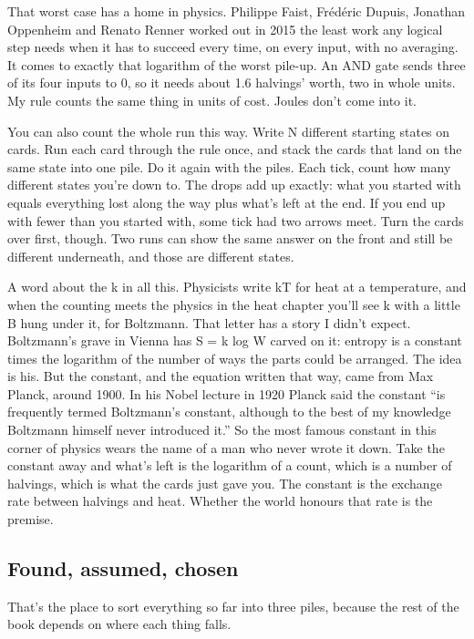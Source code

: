 \documentclass[11pt,twoside]{article}
\theoremstyle{thielethm}
\theoremstyle{thieledef}
\theoremstyle{thieledef}
\theoremstyle{thieledef}
\theoremstyle{thielethm}
\theoremstyle{thieleobs}
\theoremstyle{thielethm}
\begin{document}
That worst case has a home in physics. Philippe Faist, Frédéric Dupuis, Jonathan Oppenheim and Renato Renner worked out in 2015 the least work any logical step needs when it has to succeed every time, on every input, with no averaging. It comes to exactly that logarithm of the worst pile-up. An AND gate sends three of its four inputs to 0, so it needs about 1.6 halvings' worth, two in whole units. My rule counts the same thing in units of cost. Joules don't come into it.

You can also count the whole run this way. Write N different starting states on cards. Run each card through the rule once, and stack the cards that land on the same state into one pile. Do it again with the piles. Each tick, count how many different states you're down to. The drops add up exactly: what you started with equals everything lost along the way plus what's left at the end. If you end up with fewer than you started with, some tick had two arrows meet. Turn the cards over first, though. Two runs can show the same answer on the front and still be different underneath, and those are different states.

A word about the k in all this. Physicists write kT for heat at a temperature, and when the counting meets the physics in the heat chapter you'll see k with a little B hung under it, for Boltzmann. That letter has a story I didn't expect. Boltzmann's grave in Vienna has S = k log W carved on it: entropy is a constant times the logarithm of the number of ways the parts could be arranged. The idea is his. But the constant, and the equation written that way, came from Max Planck, around 1900. In his Nobel lecture in 1920 Planck said the constant ``is frequently termed Boltzmann's constant, although to the best of my knowledge Boltzmann himself never introduced it.'' So the most famous constant in this corner of physics wears the name of a man who never wrote it down. Take the constant away and what's left is the logarithm of a count, which is a number of halvings, which is what the cards just gave you. The constant is the exchange rate between halvings and heat. Whether the world honours that rate is the premise.

\subsection{Found, assumed, chosen}

That's the place to sort everything so far into three piles, because the rest of the book depends on where each thing falls.
\end{document}
